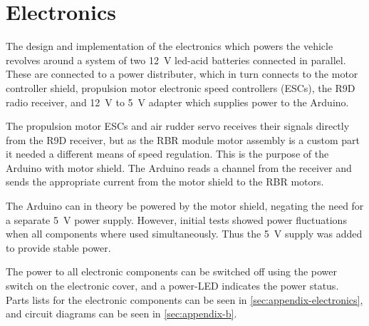 \section{Electronics}

The design and implementation of the electronics which powers the vehicle revolves
around a system of two 12~V led-acid batteries connected in parallel. These are connected
to a power distributer, which in turn connects to the motor controller shield, propulsion
motor electronic speed controllers (ESCs), the R9D radio receiver,
and 12~V to 5~V adapter which supplies power to the Arduino.

The propulsion motor ESCs and air rudder servo receives their signals directly from the R9D receiver,
but as the RBR module motor assembly is a custom part it needed a different means of speed regulation.
This is the purpose of the Arduino with motor shield. The Arduino reads a channel from the receiver
and sends the appropriate current from the motor shield to the RBR motors.

The Arduino can in theory be powered by the motor shield, negating the need for a
separate 5~V power supply. However, initial tests showed power fluctuations when all components
where used simultaneously. Thus the 5~V supply was added to provide stable power.

The power to all electronic components can be switched off using the power switch on the 
electronic cover, and a power-LED indicates the power status.
Parts lists for the electronic components can be seen in \cref{sec:appendix-electronics},
and circuit diagrams can be seen in \cref{sec:appendix-b}.